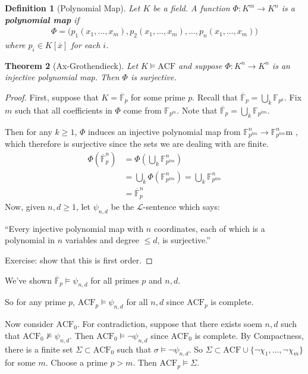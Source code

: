 \documentclass[]{article}
\theoremstyle{custhm}
\newtheorem{theorem}{Theorem}[section]
\theoremstyle{cusdef}
\newtheorem{defin}[theorem]{Definition}
\theoremstyle{custhm}
\theoremstyle{custhm}
\theoremstyle{custhm}
\theoremstyle{ex}
\theoremstyle{custhm}
\theoremstyle{cusdef}
\theoremstyle{remark}
\theoremstyle{remark}
\newcommand{\ra}{\rightarrow}
\newcommand{\undf}[1]{\textit{\textbf{#1}}}
\renewcommand{\L}{\mathcal{L}}
\renewcommand{\bar}{\overline}
\newcommand{\acf}{\textrm{ACF}}
\newcommand{\F}{\mathbb{F}}
\begin{document}
\begin{defin}[Polynomial Map]
Let $K$ be a field. A function $\Phi: K^m\ra K^n$ is a \undf{polynomial map} if
\begin{align*}
\Phi = \big(p_1(x_1,\dots,x_m),p_2(x_1,\dots,x_m),\dots,p_n(x_1,\dots,x_m)\big)
\end{align*}
where $p_i \in K[\bar{x}]$ for each $i$.
\end{defin}
\begin{theorem}[Ax-Grothendieck]
Let $K\models \acf$ and suppose $\Phi:K^n\ra K^n$ is an injective polynomial map. Then $\Phi$ is surjective.
\end{theorem}
\begin{proof}
First, suppose that $K = \bar{\mathbb{F}}_p$ for some prime $p$. Recall that $\bar{\mathbb{F}}_p = \bigcup_k \mathbb{F}_{p^k}$. Fix $m$ such that all coefficients in $\Phi$ come from $\mathbb{F}_{p^m}$. Note that $\bar{\mathbb{F}}_p = \bigcup_k \mathbb{F}_{p^{km}}$.

Then for any $k\ge 1$, $\Phi$ induces an injective polynomial map from $\mathbb{F}_{p^{km}}^n \ra \mathbb{F}_{p^{km}}^n$m , which therefore is surjective since the sets we are dealing with are finite.
\begin{align*}
\Phi\left(\bar{\mathbb{F}}_p^n\right) &= \Phi\left(\bigcup_k\mathbb{F}_{p^{km}}^n\right)\\
&= \bigcup_k\Phi\left(\mathbb{F}_{p^{km}}^n\right) = \bigcup_k\mathbb{F}_{p^{km}}^n\\
&=\bar{\mathbb{F}}_p^n
\end{align*}
Now, given $n,d\ge 1$, let $\psi_{n,d}$ be the $\L$-sentence which says:

``Every injective polynomial map with $n$ coordinates, each of which is a polynomial in $n$ variables and degree $\le d$, is surjective.''

Exercise: show that this is first order.
\end{proof}

We've shown $\bar{\F}_p \models \psi_{n,d}$ for all primes $p$ and $n,d$.

So for any prime $p$, $\acf_p\models\psi_{n,d}$ for all $n,d$ since $\acf_p$ is complete.

Now consider $\acf_0$. For contradiction, suppose that there exists soem $n,d$ such that $\acf_0\not\models\psi_{n,d}$. Then $\acf_0\models\neg\psi_{n,d}$ since $\acf_0$ is complete. By Compactness, there is a finite set $\Sigma\subset \acf_0$ such that $\sigma \models \neg \psi_{n,d}$. So $\Sigma\subset \acf\cup\{\neg\chi_1,\dots,\neg\chi_m\}$ for some $m$. Choose a prime $p > m$. Then $\acf_p\models \Sigma$.
\end{document}
